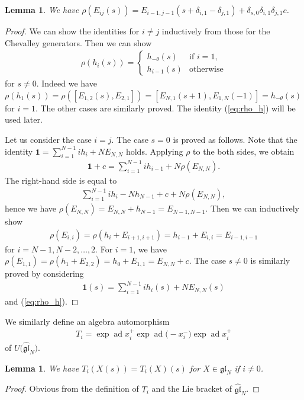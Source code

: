 \documentclass[10pt,a4paper]{amsart}
\newtheorem{lem}[thm]{Lemma}
\theoremstyle{definition}
\numberwithin{equation}{section}
\DeclareMathOperator{\ad}{ad}
\newcommand{\gl}{\mathfrak{gl}}
\newcommand{\bfid}{\mathbf{1}}
\begin{document}
\begin{lem}\label{lem:rho}We have $\rho(E_{ij}(s)) = E_{i-1,j-1}(s+\delta_{i,1}-\delta_{j,1}) + \delta_{s,0}\delta_{i,1}\delta_{j,1}c$.
\end{lem}
\begin{proof}We can show the identities for $i \neq j$ inductively from those for the Chevalley generators. Then we can show
\begin{gather}
\rho(h_i(s)) = \begin{cases}
h_{-\theta}(s) & \text{if $i=1$},\\
h_{i-1}(s) & \text{otherwise}
\end{cases}\label{eq:rho_h}
\end{gather}
for $s \neq 0$. Indeed we have $\rho(h_1(s)) = \rho([E_{1,2}(s), E_{2,1}]) = [E_{N,1}(s+1), E_{1,N}(-1)] = h_{-\theta}(s)$ for $i=1$. The other cases are similarly proved. The identity (\ref{eq:rho_h}) will be used later.

Let us consider the case $i = j$. The case $s=0$ is proved as follows. Note that the identity $\bfid = \sum\limits_{i=1}^{N-1} i h_i + N E_{N,N}$ holds. Applying $\rho$ to the both sides, we obtain
\begin{gather*}
\bfid + c = \sum_{i=1}^{N-1} i h_{i-1} + N \rho(E_{N,N}).
\end{gather*}
The right-hand side is equal to
\begin{gather*}
\sum_{i=1}^{N-1} i h_i - N h_{N-1} + c + N \rho(E_{N,N}),
\end{gather*}
hence we have $\rho(E_{N,N}) = E_{N,N} + h_{N-1} = E_{N-1,N-1}$. Then we can inductively show
\begin{gather*}
\rho(E_{i,i}) = \rho(h_i + E_{i+1,i+1}) = h_{i-1} + E_{i,i} = E_{i-1,i-1}
\end{gather*}
for $i=N-1,N-2,\ldots,2$. For $i=1$, we have $\rho(E_{1,1}) = \rho(h_1 + E_{2,2}) = h_{0} + E_{1,1} = E_{N,N} + c$. The case $s \neq 0$ is similarly proved by considering
\begin{gather*}
\bfid(s) = \sum_{i=1}^{N-1} i h_i(s) + N E_{N,N}(s)
\end{gather*}
and (\ref{eq:rho_h}).
\end{proof}

We similarly define an algebra automorphism
\begin{gather*}
T_i = \exp\ad x_i^+ \exp\ad\big({-}x_i^-\big) \exp\ad x_i^+
\end{gather*}
of $U\big(\hat{\gl}_N\big)$.

\begin{lem}\label{lem:higher}We have $T_i(X(s))=T_i(X)(s)$ for $X \in \gl_N$ if $i \neq 0$.
\end{lem}
\begin{proof}Obvious from the definition of $T_i$ and the Lie bracket of $\hat{\gl}_N$.
\end{proof}
\end{document}
